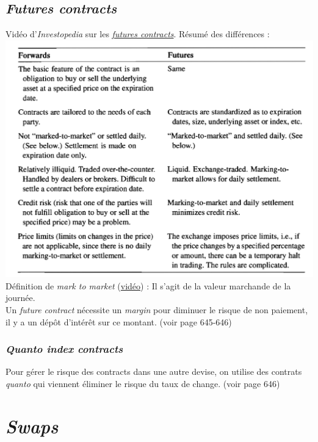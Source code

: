 \documentclass[11pt,french]{report}
\begin{document}
\section{\emph{Futures contracts}}
\label{sec:futures contracts}

Vidéo d'\emph{Investopedia} sur les \href{http://www.investopedia.com/terms/f/futurescontract.asp?o=40186&l=dir&qsrc=999&qo=investopediaSiteSearch&ap=investopedia.com}{\emph{futures contracts}}. Résumé des différences :
\\
\includegraphics[scale=0.45]{picture38.PNG}
Définition de \emph{mark to market} (\href{http://www.investopedia.com/terms/m/marktomarket.asp?o=40186&l=dir&qsrc=1&qo=serpSearchTopBox&ap=investopedia.com}{vidéo}) : Il s'agit de la valeur marchande de la journée. 
\\Un \emph{future contract} nécessite un \emph{margin} pour diminuer le risque de non paiement, il y a un dépôt d'intérêt sur ce montant. (voir page 645-646)

\subsection{\emph{Quanto index contracts}}
Pour gérer le risque des contracts dans une autre devise, on utilise des contrats \emph{quanto} qui viennent éliminer le risque du taux de change. (voir page 646)





\chapter{\emph{Swaps}}
\label{chap:swaps}
\end{document}
